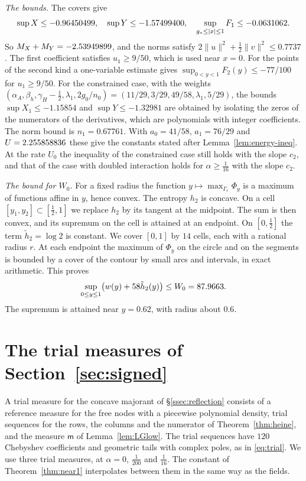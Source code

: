 \emph{The bounds.} The covers give
\[
 \sup X\le-0.96450499,\quad \sup Y\le-1.57499400,\quad \sup_{g_*\le|x|\le1}F_1\le-0.0631062 .
\]
So $M_X+M_Y=-2.53949899$, and the norms satisfy $2\|u\|^2+\frac12\|v\|^2\le0.7737$. The first coefficient satisfies
$u_1\ge9/50$, which is used near $x=0$. For the points of the second kind a one-variable estimate gives
$\sup_{0<y<1}F_2(y)\le-77/100$ for $u_1\ge9/50$. For the constrained case, with the weights
$(\alpha_A,\beta_h,\gamma_H-\frac12,\lambda_1,2g_0/n_0)=(11/29,3/29,49/58,\lambda_1,5/29)$, the bounds
$\sup X_1\le-1.15854$ and $\sup Y\le-1.32981$ are obtained by isolating the zeros of the numerators of the
derivatives, which are polynomials with integer coefficients. The norm bound is $n_1=0.67761$. With $a_0=41/58$,
$a_1=76/29$ and $U=2.255858836$ these give the constants stated after Lemma~\ref{lem:energy-ineq}. At the rate $U_0$
the inequality of the constrained case still holds with the slope $c_2$, and that of the case with doubled
interaction holds for $\alpha\ge\frac1{16}$ with the slope $c_2$.

\emph{The bound for $W_0$.} For a fixed radius the function $y\mapsto\max_{\Gamma_r}\Phi_y$ is a maximum of
functions affine in $y$, hence convex. The entropy $h_2$ is concave. On a cell $[y_1,y_2]\subset[\frac12,1]$ we
replace $h_2$ by its tangent at the midpoint. The sum is then convex, and its supremum on the cell is
attained at an endpoint. On $[0,\frac12]$ the term $\tilde h_2=\log2$ is constant. We cover $[0,1]$ by $14$
cells, each with a rational radius $r$. At each endpoint the maximum of $\Phi_y$ on the circle and on the
segments is bounded by a cover of the contour by small arcs and intervals, in exact arithmetic. This proves
\[
 \sup_{0\le y\le1}\bigl(w(y)+58\tilde h_2(y)\bigr)\le W_0=87.9663 .
\]
The supremum is attained near $y=0.62$, with radius about $0.6$.

\section{The trial measures of Section~\ref{sec:signed}}\label{app:trials}

A trial measure for the concave majorant of \S\ref{ssec:reflection} consists of a reference measure for the
free nodes with a piecewise polynomial density, trial sequences for the rows, the columns and the numerator
of Theorem~\ref{thm:heine}, and the measure $\mathsf m$ of Lemma~\ref{lem:LGlow}. The trial sequences have $120$
Chebyshev coefficients and geometric tails with complex poles, as in \eqref{eq:trial}. We use three trial
measures, at $\alpha=0$, $\frac1{200}$ and $\frac1{16}$. The constant of Theorem~\ref{thm:near1} interpolates
between them in the same way as the fields.

